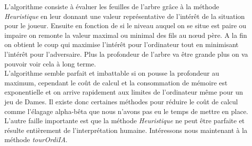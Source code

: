 \documentclass[12,french]{report}
\begin{document}
L'algorithme consiste à évaluer les feuilles de l'arbre grâce à la méthode \textit{Heuristique} en leur donnant une valeur représentative de l'intérêt de la situation pour le joueur. Ensuite en fonction de si le niveau auquel on se situe est paire ou impaire on remonte la valeur maximal ou minimal des fils au nœud père. A la fin on obtient le coup qui maximise l'intérêt pour l'ordinateur tout en minimisant l’intérêt pour l'adversaire. Plus la profondeur de l'arbre va être grande plus on va pouvoir voir cela à long terme.\\

L’algorithme semble parfait et imbattable si on pousse la profondeur au maximum, cependant le coût de calcul et la consommation de mémoire est exponentielle et on arrive rapidement aux limites de l'ordinateur même pour un jeu de Dames. Il existe donc certaines méthodes pour réduire le coût de calcul comme l'élagage alpha-bêta que nous n'avons pas eu le temps de mettre en place.\\

L'autre faille importante est que la méthode \textit{Heuristique} ne peut être parfaite et résulte entièrement de l'interprétation humaine. Intéressons nous maintenant à la méthode \textit{tourOrdiIA}.\\




%
%
%
%
%
\end{document}
